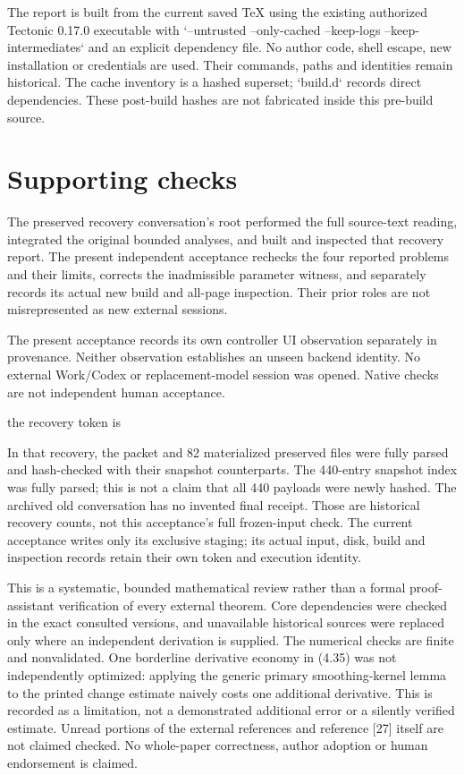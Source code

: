 \documentclass[10pt]{article}
\begin{document}
The report is built from the current saved TeX using the existing authorized Tectonic 0.17.0 executable with `–untrusted –only-cached –keep-logs –keep-intermediates` and an explicit dependency file. No author code, shell escape, new installation or credentials are used. Their commands, paths and identities remain historical. The cache inventory is a hashed superset; `build.d` records direct dependencies. These post-build hashes are not fabricated inside this pre-build source.\par
\section*{Supporting checks}
The preserved recovery conversation’s root performed the full source-text reading, integrated the original bounded analyses, and built and inspected that recovery report. The present independent acceptance rechecks the four reported problems and their limits, corrects the inadmissible parameter witness, and separately records its actual new build and all-page inspection. Their prior roles are not misrepresented as new external sessions.\par
The present acceptance records its own controller UI observation separately in provenance. Neither observation establishes an unseen backend identity. No external Work/Codex or replacement-model session was opened. Native checks are not independent human acceptance.\par
the recovery token is\par
In that recovery, the packet and 82 materialized preserved files were fully parsed and hash-checked with their snapshot counterparts. The 440-entry snapshot index was fully parsed; this is not a claim that all 440 payloads were newly hashed. The archived old conversation has no invented final receipt. Those are historical recovery counts, not this acceptance’s full frozen-input check. The current acceptance writes only its exclusive staging; its actual input, disk, build and inspection records retain their own token and execution identity.\par
This is a systematic, bounded mathematical review rather than a formal proof-assistant verification of every external theorem. Core dependencies were checked in the exact consulted versions, and unavailable historical sources were replaced only where an independent derivation is supplied. The numerical checks are finite and nonvalidated. One borderline derivative economy in (4.35) was not independently optimized: applying the generic primary smoothing-kernel lemma to the printed change estimate naively costs one additional derivative. This is recorded as a limitation, not a demonstrated additional error or a silently verified estimate. Unread portions of the external references and reference [27] itself are not claimed checked. No whole-paper correctness, author adoption or human endorsement is claimed.\par
\end{document}
